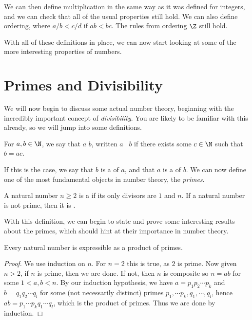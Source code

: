 \documentclass[a4paper]{scrreprt}
\begin{document}
We can then define multiplication in the same way as it was defined for integers, and we can check that all of the usual properties still hold. We can also define ordering, where $a/b < c/d$ if $ab < bc$. The rules from ordering $\Z$ still hold.

With all of these definitions in place, we can now start looking at some of the more interesting properties of numbers.

\section{Primes and Divisibility}

We will now begin to discuss some actual number theory, beginning with the incredibly important concept of \emph{divisibility}. You are likely to be familiar with this already, so we will jump into some definitions.

\begin{definition}[Divisibility]
	For $a, b \in \N$, we say that $a$  $b$, written $a \mid b$ if there exists some $c \in \N$ such that $b = ac$.
\end{definition}

If this is the case, we say that $b$ is a  of $a$, and that $a$ is a  of $b$. We can now define one of the most fundamental objects in number theory, the \emph{primes}.

\begin{definition}[Primes]
	A natural number $n \geq 2$ is a  if its only divisors are $1$ and $n$. If a natural number is not prime, then it is .
\end{definition}

With this definition, we can begin to state and prove some interesting results about the primes, which should hint at their importance in number theory.

\begin{theorem}\label{thm:product-primes}
	Every natural number is expressible as a product of primes.
\end{theorem}
\begin{proof}
	We use induction on $n$. For $n = 2$ this is true, as $2$ is prime. Now given $n > 2$, if $n$ is prime, then we are done. If not, then $n$ is composite so $n = ab$ for some $1 < a, b < n$. By our induction hypothesis, we have $a = p_1 p_2 \cdots p_k$ and $b = q_1 q_2 \cdots q_l$ for some (not necessarily distinct) primes $p_1, \cdots p_k, q_1, \cdots, q_l$, hence $ab = p_1 \cdots p_k q_1 \cdots q_l$, which is the product of primes. Thus we are done by induction.
\end{proof}
\end{document}
